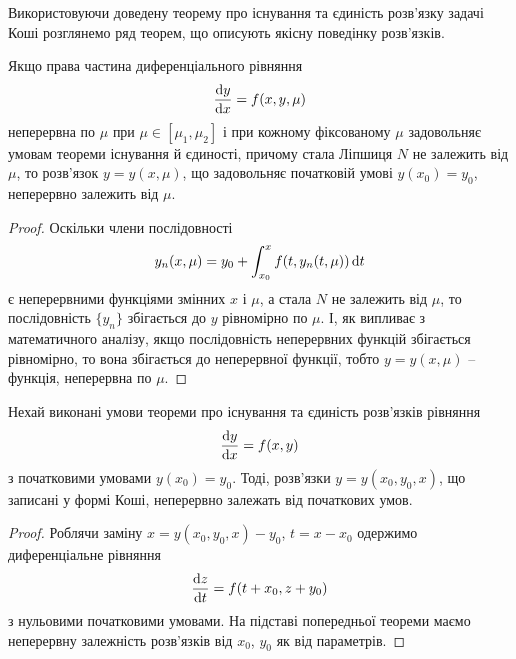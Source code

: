 Використовуючи доведену теорему про існування та єдиність розв’язку задачі Коші розглянемо ряд теорем, що описують якісну поведінку розв’язків.

\begin{theorem}
	Якщо права частина диференціального рівняння
	\begin{equation}
		\label{eq:1.6.17}
		\frac{\mathop{}\!\mathrm{d} y}{\mathop{}\!\mathrm{d} x} = f(x, y, \mu)
	\end{equation}
	неперервна по $\mu$ при $\mu \in [\mu_1, \mu_2]$ і при кожному фіксованому $\mu$ задовольняє умовам теореми існування й єдиності, причому стала Ліпшиця $N$ не залежить від $\mu$, то розв’язок $y = y(x, \mu)$, що задовольняє початковій умові $y(x_0)=y_0$, неперервно залежить від $\mu$.
\end{theorem}
\begin{proof} 
	Оскільки члени послідовності
	\begin{equation}
		\label{eq:1.6.18}
		y_n(x, \mu) = y_0 + \int_{x_0}^x f(t, y_n(t, \mu)) \mathop{}\!\mathrm{d} t
	\end{equation}
	є неперервними функціями змінних $x$ і $\mu$, а стала $N$ не залежить від $\mu$, то послідовність $\{y_n\}$ збігається до $y$ рівномірно по $\mu$. І, як випливає з математичного аналізу, якщо послідовність неперервних функцій збігається рівномірно, то вона збігається до неперервної функції, тобто $y=y(x,\mu)$ -- функція, неперервна по $\mu$.
\end{proof}

\begin{theorem}
	Нехай виконані умови теореми про існування та єдиність розв’язків рівняння
	\begin{equation}
		\label{eq:1.6.19}
		\frac{\mathop{}\!\mathrm{d} y}{\mathop{}\!\mathrm{d} x} = f(x,y)
	\end{equation}
	з початковими умовами $y(x_0) = y_0$. Тоді, розв’язки $y=y(x_0,y_0,x)$, що записані у формі Коші, неперервно залежать від початкових умов. 
\end{theorem}
\begin{proof}
	Роблячи заміну $x = y(x_0, y_0, x) - y_0$, $t = x - x_0$ одержимо диференціальне рівняння  
	\begin{equation}
		\label{eq:1.6.20}
		\frac{\mathop{}\!\mathrm{d} z}{\mathop{}\!\mathrm{d} t} = f(t + x_0, z + y_0)
	\end{equation}
	з нульовими початковими умовами. На підставі попередньої теореми маємо неперервну залежність розв’язків від $x_0$, $y_0$ як від параметрів.
\end{proof}

